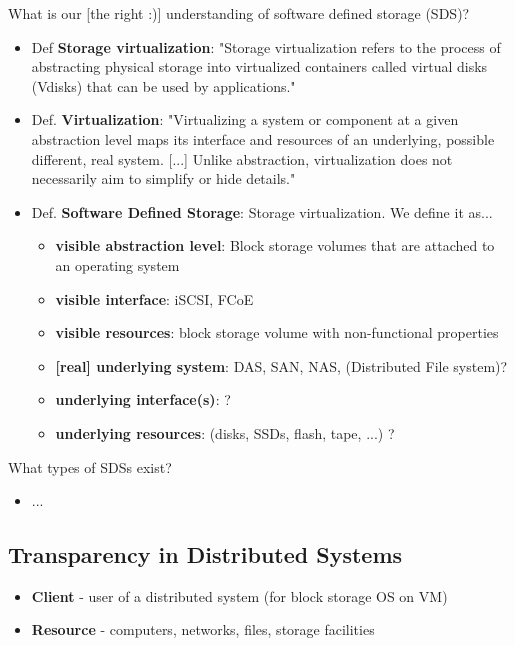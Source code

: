 What is our [the right :)] understanding of software defined storage (SDS)?
\begin{itemize}
\item Def \textbf{Storage virtualization}: "Storage virtualization refers to the process of abstracting physical storage into virtualized containers called virtual disks (Vdisks) that can be used by applications." \cite{Singh2008}
\item Def. \textbf{Virtualization}: "Virtualizing a system or component at a given abstraction level maps its interface and resources of an underlying, possible different, real system. [...] Unlike abstraction, virtualization does not necessarily aim to simplify or hide details." \cite{Smith2005]}
\item Def. \textbf{Software Defined Storage}: Storage virtualization. We define it as...
	\begin{itemize}
		\item \textbf{visible abstraction level}: Block storage volumes that are attached to an operating system 
		\item \textbf{visible interface}:  iSCSI, FCoE
		\item \textbf{visible resources}: block storage volume with non-functional properties
		\item \textbf{[real] underlying system}: DAS, SAN, NAS, (Distributed File system)?
		\item \textbf{underlying interface(s)}: ?
		\item \textbf{underlying resources}: (disks, SSDs, flash, tape, ...) ?
	\end{itemize}
\end{itemize}

What types of SDSs exist?
\begin{itemize}
\item ...
\end{itemize}

\subsection{Transparency in Distributed Systems}

\begin{itemize}
\item \textbf{Client} - user of a distributed system (for block storage OS on VM)
\item \textbf{Resource} - computers, networks, files, storage facilities \cite{Tanenbaum2007}
\end{itemize}


